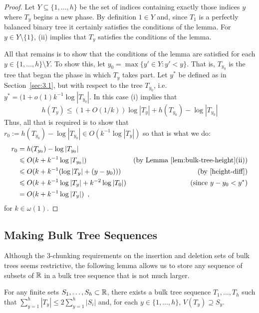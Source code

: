 \documentclass[kpfonts]{patmorin}
\newcommand{\snote}[1]{\fcolorbox{red}{yellow}{#1}}
\let\le\leqslant
\begin{document}
\begin{proof}
  Let $Y\subseteq\{1,\ldots,h\}$ be the set of indices containing exactly those indices $y$ where $T_y$ begins a new phase. By definition $1\in Y$ and, since $T_1$ is a perfectly balanced binary tree it certainly satisfies the conditions of the lemma.  For $y\in Y\setminus\{1\}$, 
  (ii) implies that $T_y$ satisfies the conditions of the lemma.  
  
  All that remains is to show that the conditions of the lemma are satisfied for each $y\in\{1,\ldots,h\}\setminus Y$. To show this, let $y_0=\max\{ y'\in Y: y'<y\}$.  That is, $T_{y_0}$ is the tree that began the phase in which $T_y$ takes part.  Let $y^*$ be defined as in Section~\ref{sec:3.1}, but with respect to the tree $T_{y_0}$, i.e.\ $y^*=(1+o(1)k^{-1}\log |T_{y_0}|$. In this case (i) implies that
  \[  h(T_y) \le (1+O(1/k))\log |T_y| + h(T_{y_0})-\log|T_{y_0}| \]  
  Thus, all that is required is to show that $r_0:=h(T_{y_0})-\log|T_{y_0}|\in O(k^{-1}\log|T_y|)$ so that is what we do:
  \begin{align*}
    r_0 &= h(T_{y_0})-\log|T_{y_0}| \\
       &\le O(k + k^{-1}\log|T_{y_0}|) 
        & \text{(by \lemref{bulk-tree-height}(ii))}\\
       &\le O(k + k^{-1}(\log|T_{y}| + (y-y_0))) 
        & \text{(by \eqref{height-diff})} \\
       &\le O(k + k^{-1}\log|T_{y}| + k^{-2}\log|T_0|) 
        & \text{(since $y-y_0 < y^*$)}\\
       &= O(k + k^{-1}\log|T_{y}|) \enspace ,
  \end{align*}
  for $k\in\omega(1)$. 
\end{proof}



\subsection{Making Bulk Tree Sequences}

Although the 3-chunking requirements on the insertion and deletion sets of bulk trees seems restrictive, the following lemma allows us to store any sequence of subsets of $\mathbb{R}$ in a bulk tree sequence that is not much larger.

\begin{lem}
  For any finite sets $S_1,\ldots,S_h\subset\mathbb{R}$, there exists a bulk tree sequence $T_1,\ldots,T_h$ such that $\sum_{y=1}^h |T_y|\le 2\sum_{y=1}^h |S_i|$ and, for each $y\in\{1,\ldots,h\}$, $V(T_y)\supseteq S_y$.
\end{lem}
\end{document}

